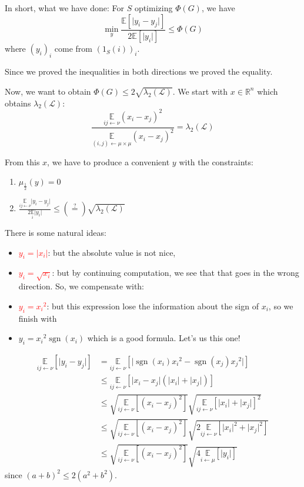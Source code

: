 \documentclass[12pt]{article}
\newcommand{\EE}{\mathbb{E}}
\newcommand{\RR}{\mathbb{R}}
\renewcommand{\L}{\mathcal{L}}
\newcommand{\la}{\leftarrow}
\newcommand{\esp}[2][]{\underset{#1}{\EE}\left[ #2 \right]}
\DeclareMathOperator{\sgn}{sgn}
\begin{document}
In short, what we have done: For $S$ optimizing $\Phi(G)$, we have
\[
    \min\limits_y \frac{\esp{\lvert y_i-y_j\rvert}}{2\esp{\lvert y_i \rvert}} \leqslant \Phi(G)
\]
where $(y_i)_i$ come from $(1_S(i))_i$.

\bigskip

Since we proved the inequalities in both directions we proved the equality.

\bigskip

Now, we want to obtain $\Phi(G) \leqslant 2\sqrt{\lambda_2(\L)}$. We start with $x\in\RR^n$ which obtains $\lambda_2(\L)$:
\[
    \frac{\underset{ij\la \nu}{\EE}(x_i-x_j)^2}{\underset{(i,j)\la\mu\times\mu}{\EE}(x_i-x_j)^2} = \lambda_2(\L)
\]

From this $x$, we have to produce a convenient $y$ with the constraints:
\begin{enumerate}[(1)]
    \item $\mu_{\frac{1}{2}}(y) = 0$
    \item $\frac{\underset{ij\la\nu}{\EE}\lvert y_i-y_j\rvert}{2\underset{i}{\EE}\lvert y_i \rvert} \leqslant (\overset{?}{=}) \sqrt{\lambda_2(\L)}$
\end{enumerate}

There is some natural ideas:
\begin{itemize}
    \item \textcolor{red}{$y_i = \lvert x_i \rvert$}: but the absolute value is not nice, 
    \item \textcolor{red}{$y_i = \sqrt{x_i}$}: but by continuing computation, we see that that goes in the wrong direction. So, we compensate with:
    \item \textcolor{red}{$y_i = {x_i}^2$}: but this expression lose the information about the sign of $x_i$, so we finish with
    \item \textcolor{green!50!black}{$y_i = {x_i}^2 \sgn(x_i)$} which is a good formula. Let's us this one!
\end{itemize}

\[
    \begin{aligned}
        \esp[ij\la\nu]{\lvert y_i - y_j \rvert} &= \esp[ij \la \nu]{\lvert \sgn(x_i){x_i}^2 - \sgn(x_j){x_j}^2\rvert}\\
        &\leqslant \esp[ij\la \nu]{\lvert x_i-x_j \rvert(\lvert x_i \rvert + \lvert x_j \rvert)}\\
        &\leqslant \sqrt{\esp[ij\la\nu]{(x_i-x_j)^2}} \sqrt{\esp[ij\la \nu]{\lvert x_i \rvert + \lvert x_j \rvert}^2}\\
        &\leqslant \sqrt{\esp[ij\la\nu]{(x_i-x_j)^2}} \sqrt{2\esp[ij\la \nu]{\lvert x_i \rvert^2 + \lvert x_j \rvert^2}}\\
        &\leqslant \sqrt{\esp[ij\la\nu]{(x_i-x_j)^2}} \sqrt{4\esp[i\la \mu]{\lvert y_i \rvert}}
    \end{aligned}
\]
since $(a+b)^2 \leqslant 2(a^2+b^2)$.
\end{document}
